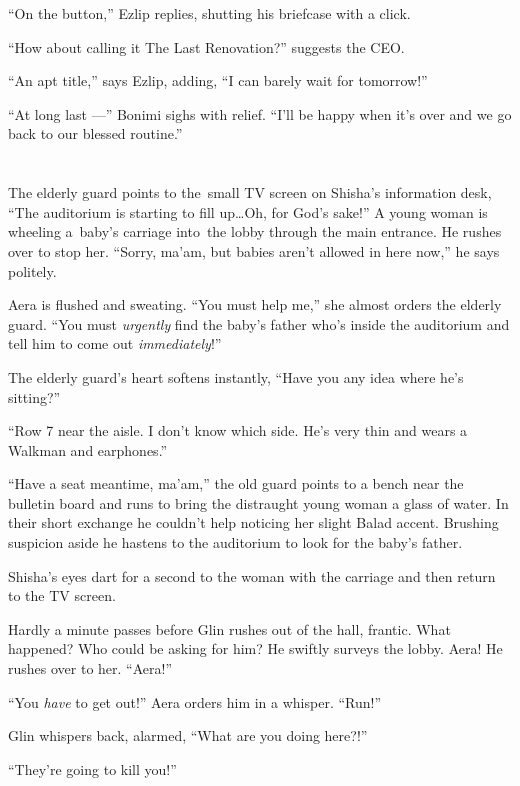 \documentclass[twoside,11pt,openany]{book}
\begin{document}
``On the button,'' Ezlip replies, shutting his briefcase with a click.

``How about calling it The Last Renovation?'' suggests the CEO.

``An apt title,'' says Ezlip, adding, ``I can barely wait for
tomorrow!''

``At long last ---'' Bonimi sighs with relief. ``I'll be happy when it's over and
we go back to our blessed routine.''


\chapter{}

The elderly guard points to the~small TV screen on Shisha's information desk, ``The auditorium is starting
to fill up{\ldots}Oh, for God's sake!'' A young woman is wheeling a~baby's carriage into~the lobby
through the main entrance. He rushes over to stop her. ``Sorry,
ma'am, but babies aren't allowed in here now,'' he says politely.

Aera is flushed and sweating. ``You must help me,'' she almost orders the elderly guard.
``You must \textit{urgently} find the baby's father who's inside the auditorium and tell him to come out
\textit{immediately}!''

The elderly guard's heart softens instantly, ``Have you any idea where he's sitting?''

``Row 7 near the aisle. I don't know which side. He's very thin and wears a Walkman and
earphones.''

``Have a seat meantime, ma'am,'' the old guard points to a bench near the bulletin board and runs to bring
the distraught young woman a glass of water. In their short exchange he couldn't help noticing her slight Balad accent.
Brushing suspicion aside he hastens to the auditorium to look for the baby's father.

Shisha's eyes dart for a second to the woman with{ }the carriage and then
return to the TV screen.

Hardly a minute passes before Glin rushes out of the hall, frantic. What happened? Who could be asking for him? He
swiftly surveys the lobby. Aera! He rushes over to her. ``Aera!''

``You \textit{have} to get out!'' Aera orders him in a whisper.
``Run!''

Glin whispers back, alarmed{, }{}``What are you doing here?!''

``They're going to kill you!''
\end{document}
